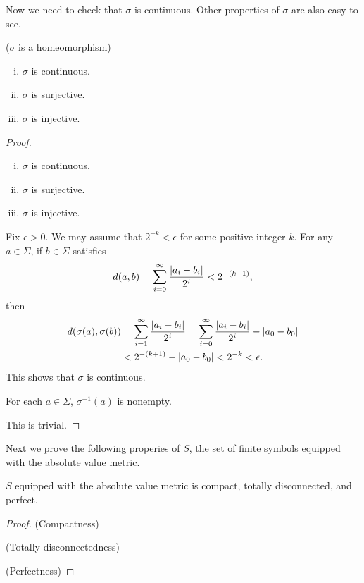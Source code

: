 \documentclass[10pt,twoside]{book}
\begin{document}
Now we need to check that $\sigma$ is continuous.
Other properties of $\sigma$ are also easy to see.
\begin{proposition}
  ($\sigma$ is a homeomorphism)
  \begin{enumerate}[(i)]
    \item $\sigma$ is continuous.
    \item  $\sigma$ is surjective.
    \item  $\sigma$ is injective.
  \end{enumerate}
  \begin{proof}
    \begin{enumerate}[(i)]
      \item $\sigma$ is continuous.
      \item  $\sigma$ is surjective.
      \item  $\sigma$ is injective.
    \end{enumerate}
  \item
    Fix $\epsilon > 0$.
    We may assume that $2^{-k} < \epsilon$ for some positive integer $k$.
    For any $a \in \Sigma$, if $b \in \Sigma$ satisfies
    \begin{equation*}
      d(a,b) = \sum\limits_{i=0}^{\infty} \frac{\left | a_i - b_i \right |}{2^i} < 2^{-(k+1)},
    \end{equation*}
    then 
    \begin{align*}
      d(\sigma(a), \sigma(b)) 
      &= \sum\limits_{i=1}^{\infty} \frac{\left | a_i - b_i \right |}{2^i} 
      = \sum\limits_{i=0}^{\infty} \frac{\left | a_i - b_i \right |}{2^i} - \left | a_0 - b_0 \right |  \\
      &< 2^{-(k+1)} - \left | a_0 - b_0 \right |
      < 2^{-k}
      < \epsilon.
    \end{align*}
    This shows that $\sigma$ is continuous.
  \item
    For each $a \in \Sigma$, $\sigma^{-1}(a)$ is nonempty.
  \item
    This is trivial.
  \end{proof}
  \label{prop:symb-sigma-cont}
\end{proposition}
Next we prove the following properies of $S$, the set of finite symbols equipped with the absolute value metric.
\begin{proposition}
  $S$ equipped with the absolute value metric is compact, totally disconnected, and perfect.
  \begin{proof}
    (Compactness)

    (Totally disconnectedness)

    (Perfectness)

  \end{proof}
\end{proposition}
\end{document}
